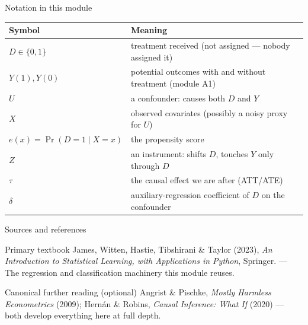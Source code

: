 \documentclass[aspectratio=169,11pt]{beamer}
\begin{document}
\begin{frame}{Notation in this module}
  \footnotesize
  \begin{center}
  \begin{tabular}{@{}ll@{}}
    \toprule
    \textbf{Symbol} & \textbf{Meaning} \\
    \midrule
    $D \in \{0,1\}$ & treatment received (not assigned --- nobody assigned it) \\
    $Y(1), Y(0)$ & potential outcomes with and without treatment (module A1) \\
    $U$ & a confounder: causes both $D$ and $Y$ \\
    $X$ & observed covariates (possibly a noisy proxy for $U$) \\
    $e(x) = \Pr(D=1 \mid X=x)$ & the propensity score \\
    $Z$ & an instrument: shifts $D$, touches $Y$ only through $D$ \\
    $\tau$ & the causal effect we are after (ATT/ATE) \\
    $\delta$ & auxiliary-regression coefficient of $D$ on the confounder \\
    \bottomrule
  \end{tabular}
  \end{center}
\end{frame}

\begin{frame}{Sources and references}
  \begin{block}{Primary textbook}
    James, Witten, Hastie, Tibshirani \& Taylor (2023),
    \emph{An Introduction to Statistical Learning, with Applications in Python},
    Springer. --- The regression and classification machinery this module reuses.
  \end{block}
  \begin{block}{Canonical further reading (optional)}
    Angrist \& Pischke, \emph{Mostly Harmless Econometrics} (2009);
    Hern\'an \& Robins, \emph{Causal Inference: What If} (2020) --- both develop
    everything here at full depth.
  \end{block}
\end{frame}
\end{document}
